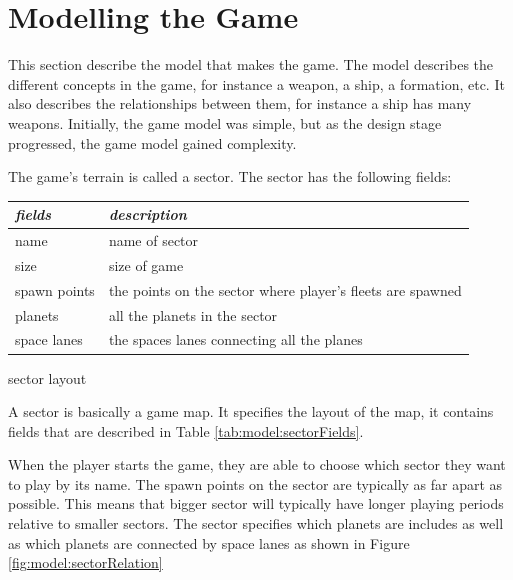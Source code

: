 \section{Modelling the Game}
\label{sec:model}

% 

This section describe the model that makes the game.
The model describes the different concepts in the game, for instance a weapon, a ship, a formation, etc.
It also describes the relationships between them, for instance a ship has many weapons.
Initially, the game model was simple, but as the design stage progressed, the game model gained complexity.

The game's terrain is called a sector. The sector has the following fields:
\begin{margintable}
    \begin{tabular}{p{4em} p{11em}}
    \toprule
    \emph{fields} & \emph{description} \\
    \midrule

    name & name of sector \\
    size & size of game \\
    spawn points & the points on the sector where player's fleets are spawned \\
    planets & all the planets in the sector \\
    space lanes & the spaces lanes connecting all the planes \\

    \bottomrule
    \end{tabular}
    	\vspace{1em}
	\caption{sector layout}
	\label{tab:model:sectorFields}
\end{margintable}

A sector is basically a game map.
It specifies the layout of the map, it contains fields that are described in Table \ref{tab:model:sectorFields}.

When the player starts the game, they are able to choose which sector they want to play by its name. 
The spawn points on the sector are typically as far apart as possible. 
This means that bigger sector will typically have longer playing periods relative to smaller sectors.
The sector specifies which planets are includes as well as which planets are connected by space lanes as shown in Figure \ref{fig:model:sectorRelation}

